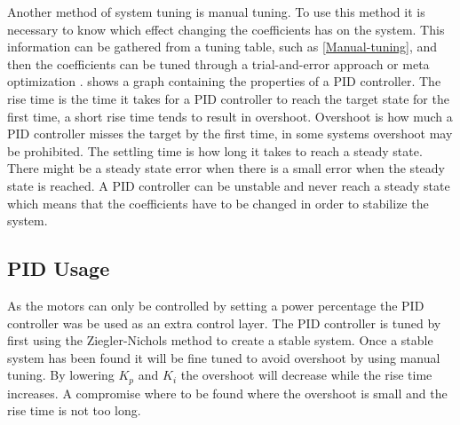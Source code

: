 

Another method of system tuning is manual tuning. To use this method it is necessary to know which effect changing the coefficients has on the system. This information can be gathered from a tuning table, such as \cref{Manual-tuning}, and then the coefficients can be tuned through a trial-and-error approach or meta optimization \cite{PIDmetaOptimization}.  shows a graph containing the properties of a PID controller. The rise time is the time it takes for a PID controller to reach the target state for the first time, a short rise time tends to result in overshoot. Overshoot is how much a PID controller misses the target by the first time, in some systems overshoot may be prohibited. The settling time is how long it takes to reach a steady state. There might be a steady state error when there is a small error when the steady state is reached. A PID controller can be unstable and never reach a steady state which means that the coefficients have to be changed in order to stabilize the system.



\subsection{PID Usage}
As the motors can only be controlled by setting a power percentage the PID controller was be used as an extra control layer. The PID controller is tuned by first using the Ziegler-Nichols method to create a stable system. Once a stable system has been found it will be fine tuned to avoid overshoot by using manual tuning. By lowering $K_p$ and $K_i$ the overshoot will decrease while the rise time increases. A compromise where to be found where the overshoot is small and the rise time is not too long.

